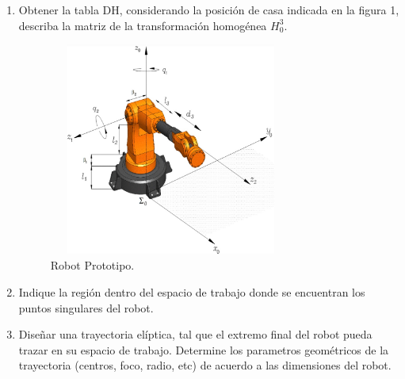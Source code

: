 \documentclass[12pt]{article}
\begin{document}
\begin{enumerate}
    \item Obtener la tabla DH, considerando la posición de casa indicada en la figura 1, describa la matriz de la transformación homogénea $H_0^3$.
    \begin{figure}[h]
        \centering
        \includegraphics[width=8cm, height=7cm]{IMAGENES/1.jpg}
        \caption{Robot Prototipo.}
        \label{fig:proto}
    \end{figure}
    \item Indique la región dentro del espacio de trabajo donde se encuentran los puntos singulares del robot.
    \item Diseñar una trayectoria elíptica, tal que el extremo final del robot pueda trazar en su espacio de trabajo. Determine los parametros geométricos de la trayectoria (centros, foco, radio, etc) de acuerdo a las dimensiones del robot.
\end{enumerate}
\end{document}
